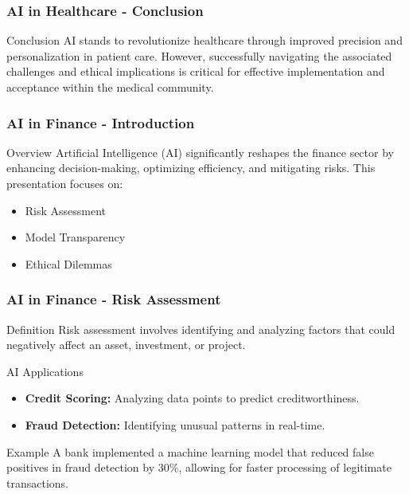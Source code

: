 \documentclass[aspectratio=169]{beamer}
\begin{document}
\begin{frame}[fragile]
    \frametitle{AI in Healthcare - Conclusion}
    \begin{block}{Conclusion}
        AI stands to revolutionize healthcare through improved precision and personalization in patient care. 
        However, successfully navigating the associated challenges and ethical implications is critical for effective implementation and acceptance within the medical community.
    \end{block}
\end{frame}

\begin{frame}[fragile]
    \frametitle{AI in Finance - Introduction}
    \begin{block}{Overview}
        Artificial Intelligence (AI) significantly reshapes the finance sector by enhancing decision-making, optimizing efficiency, and mitigating risks. This presentation focuses on:
        \begin{itemize}
            \item Risk Assessment
            \item Model Transparency
            \item Ethical Dilemmas
        \end{itemize}
    \end{block}
\end{frame}

\begin{frame}[fragile]
    \frametitle{AI in Finance - Risk Assessment}
    \begin{block}{Definition}
        Risk assessment involves identifying and analyzing factors that could negatively affect an asset, investment, or project.
    \end{block}
    
    \begin{block}{AI Applications}
        \begin{itemize}
            \item \textbf{Credit Scoring:} Analyzing data points to predict creditworthiness.
            \item \textbf{Fraud Detection:} Identifying unusual patterns in real-time.
        \end{itemize}
    \end{block}
    
    \begin{block}{Example}
        A bank implemented a machine learning model that reduced false positives in fraud detection by 30\%, allowing for faster processing of legitimate transactions.
    \end{block}
\end{frame}
\end{document}
